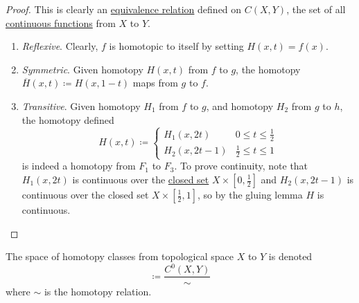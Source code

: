 	\begin{proof}
		This is clearly an \hyperref[st-def:equivalence_relation]{equivalence relation} defined on $C(X, Y)$, the set of all \hyperref[pst-def:continuous_func]{continuous functions} from $X$ to $Y$.
		\begin{enumerate}
			\item \textit{Reflexive}. Clearly, $f$ is homotopic to itself by setting $H(x, t) = f(x)$. 

			\item \textit{Symmetric}. Given homotopy $H(x, t)$ from $f$ to $g$, the homotopy $\overline{H}(x, t) \coloneqq H(x, 1-t)$ maps from $g$ to $f$. 

			\item \textit{Transitive}. Given homotopy $H_1$ from $f$ to $g$, and homotopy $H_2$ from $g$ to $h$, the homotopy defined
				\begin{equation}
					H (x, t) \coloneqq \begin{cases}
						H_1 (x, 2t) & 0 \leq t \leq \frac{1}{2} \\
						H_2 (x, 2t - 1) & \frac{1}{2} \leq t \leq 1
					\end{cases}
				\end{equation}
				is indeed a homotopy from $F_1$ to $F_3$. To prove continuity, note that $H_1 (x, 2t)$ is continuous over the \hyperref[pst-def:closed]{closed set} $X \times [0, \frac{1}{2}]$ and $H_2 (x, 2t - 1)$ is continuous over the closed set $X \times [\frac{1}{2}, 1]$, so by the gluing lemma $H$ is continuous. 
		\end{enumerate}
	\end{proof}

	\begin{definition}
	  \label{def:homotopy-class}
    The space of homotopy classes from topological space $X$ to $Y$ is denoted
    \begin{equation}
      [X, Y] \coloneqq \frac{C^0 (X, Y)}{\sim}
    \end{equation}
    where $\sim$ is the homotopy relation. 
  \end{definition}

